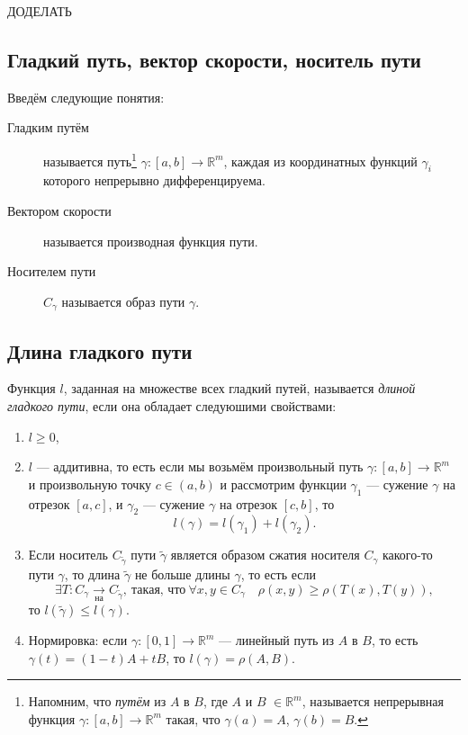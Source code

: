 \begin{example}
	ДОДЕЛАТЬ
\end{example}

\subsection{Гладкий путь, вектор скорости, носитель пути}

\begin{definition}
	Введём следующие понятия:
	\begin{description}
		\item[Гладким путём] называется путь\footnote{Напомним, что \textit{путём} из \(A\) в \(B\), где \(A\) и \(B\) \(\in \mathbb{R}^m\), называется непрерывная функция \(\gamma \colon [a, b] \to \mathbb{R}^m\) такая, что \(\gamma(a) = A\), \(\gamma(b) = B\).} \(\gamma \colon [a, b] \to \mathbb{R}^m\), каждая из координатных функций \(\gamma_i\) которого непрерывно дифференцируема.
		\item[Вектором скорости] называется производная функция пути.
		\item[Носителем пути] \(C_\gamma\) называется образ пути \(\gamma\).
	\end{description}
\end{definition}

\subsection{Длина гладкого пути}

\begin{definition}
	Функция \(l\), заданная на множестве всех гладкий путей, называется \textit{длиной гладкого пути}, если она обладает следуюшими свойствами:
	\begin{enumerate}
		\item \(l \geqslant 0\),
		\item \label{way2} \(l\) --- аддитивна, то есть если мы возьмём произвольный путь \(\gamma \colon [a, b] \to \mathbb{R}^m\) и произвольную точку \(c \in (a, b)\) и рассмотрим функции \(\gamma_1\) --- сужение \(\gamma\) на отрезок \([a, c]\), и \(\gamma_2\) --- сужение \(\gamma\) на отрезок \([c, b]\), то \[
		l(\gamma) = l(\gamma_1) + l(\gamma_2).
		\]
		\item \label{way3}Если носитель \(C_{\widetilde{\gamma}}\) пути \(\widetilde{\gamma}\) является образом сжатия носителя \(C_\gamma\) какого-то пути \(\gamma\), то длина 	\(\widetilde{\gamma}\) не больше длины \(\gamma\), то есть если \[
		\exists T \colon C_\gamma \xrightarrow[\text{на}]{} C_{\widetilde{\gamma}}, \ \textit{такая, что} \ \forall x, y \in C_\gamma \quad \rho(x, y) \geqslant \rho(T(x), T(y)),
		\]
		то \(l(\widetilde{\gamma}) \leqslant l(\gamma)\).
		\item Нормировка: если \(\gamma \colon [0, 1] \to \mathbb{R}^m\) --- линейный путь из \(A\) в \(B\), то есть \(\gamma(t) = (1 - t)A + tB\), то \(l(\gamma) = \rho(A, B)\).
	\end{enumerate}
\end{definition}

